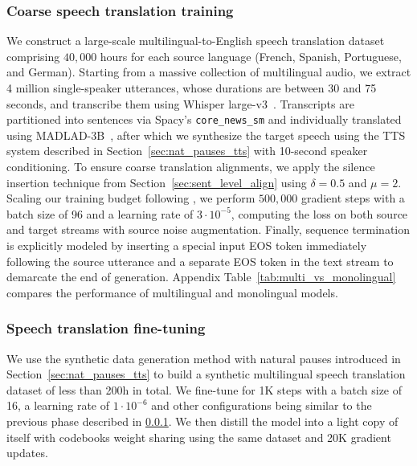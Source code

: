 \subsubsection{Coarse speech translation training}
\label{sec:st_training}

We construct a large-scale multilingual-to-English speech translation dataset comprising $40,000$ hours for each source language (French, Spanish, Portuguese, and German). Starting from a massive collection of multilingual audio, we extract 4 million single-speaker utterances, whose durations are between 30 and 75 seconds, and transcribe them using Whisper large-v3~\citep{whisper}. Transcripts are partitioned into sentences via Spacy's \texttt{core\_news\_sm} and individually translated using MADLAD-3B~\citep{madlad}, after which we synthesize the target speech using the TTS system described in Section~\ref{sec:nat_pauses_tts} with 10-second speaker conditioning. To ensure coarse translation alignments, we apply the silence insertion technique from Section~\ref{sec:sent_level_align} using $\delta=0.5$ and $\mu=2$. Scaling our training budget following \citet{hibiki}, we perform $500,000$ gradient steps with a batch size of 96 and a learning rate of $3\cdot10^{-5}$, computing the loss on both source and target streams with source noise augmentation. Finally, sequence termination is explicitly modeled by inserting a special input EOS token immediately following the source utterance and a separate EOS token in the text stream to demarcate the end of generation. Appendix Table~\ref{tab:multi_vs_monolingual} compares the performance of multilingual and monolingual models.

\subsubsection{Speech translation fine-tuning}
\label{sec:st_finetuning}
We use the synthetic data generation method with natural pauses introduced in Section~\ref{sec:nat_pauses_tts} to build a synthetic multilingual speech translation dataset of less than 200h in total. We fine-tune for 1K steps with a batch size of 16, a learning rate of $1\cdot10^{-6}$ and other configurations being similar to the previous phase described in \ref{sec:st_training}. We then distill the model into a light copy of itself with codebooks weight sharing using the same dataset and 20K gradient updates.

